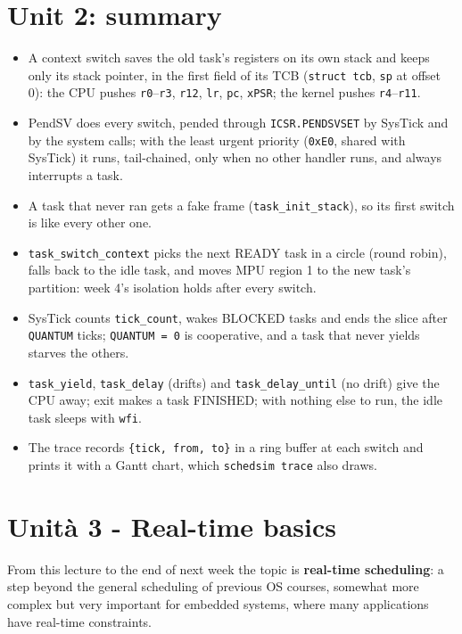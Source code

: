 \section{Unit 2: summary}
\begin{itemize}
    \item A context switch saves the old task's registers on its own stack and keeps only its stack pointer, in the first field of its TCB (\texttt{struct tcb}, \texttt{sp} at offset 0): the CPU pushes \texttt{r0}--\texttt{r3}, \texttt{r12}, \texttt{lr}, \texttt{pc}, \texttt{xPSR}; the kernel pushes \texttt{r4}--\texttt{r11}.
    \item PendSV does every switch, pended through \texttt{ICSR.PENDSVSET} by SysTick and by the system calls; with the least urgent priority (\texttt{0xE0}, shared with SysTick) it runs, tail-chained, only when no other handler runs, and always interrupts a task.
    \item A task that never ran gets a fake frame (\texttt{task\_init\_stack}), so its first switch is like every other one.
    \item \texttt{task\_switch\_context} picks the next READY task in a circle (round robin), falls back to the idle task, and moves MPU region 1 to the new task's partition: week 4's isolation holds after every switch.
    \item SysTick counts \texttt{tick\_count}, wakes BLOCKED tasks and ends the slice after \texttt{QUANTUM} ticks; \texttt{QUANTUM = 0} is cooperative, and a task that never yields starves the others.
    \item \texttt{task\_yield}, \texttt{task\_delay} (drifts) and \texttt{task\_delay\_until} (no drift) give the CPU away; exit makes a task FINISHED; with nothing else to run, the idle task sleeps with \texttt{wfi}.
    \item The trace records \texttt{\{tick, from, to\}} in a ring buffer at each switch and prints it with a Gantt chart, which \texttt{schedsim trace} also draws.
\end{itemize}



\section{Unità 3 - Real-time basics}
From this lecture to the end of next week the topic is \textbf{real-time scheduling}: a step beyond the general scheduling of previous OS courses, somewhat more complex but very important for embedded systems, where many applications have real-time constraints.

